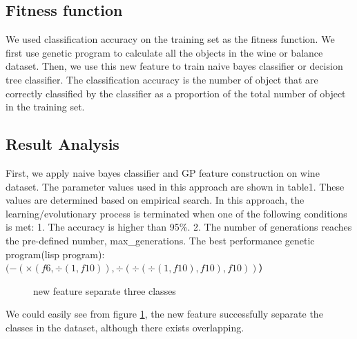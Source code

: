 \documentclass[11pt, a4paper, oneside, openright]{article}
\begin{document}
\subsection{Fitness function}
We used classification accuracy on the training set as the fitness function.  We first use genetic program to calculate all the objects in the wine or balance dataset. Then, we use this new feature to train naive bayes classifier or decision tree classifier.  The classification accuracy is the number of object that are correctly classified by the classifier as a proportion of the total number of object in the training set.

\subsection{Result Analysis}
First, we apply naive bayes classifier and GP feature construction on wine dataset.
The parameter values used in this approach are shown in table1. These values are determined based on empirical search. In this approach, the learning/evolutionary process is terminated when one of the following conditions is met:
1. The accuracy is higher than 95\%.
2. The number of generations reaches the pre-defined number, max\_generations.
The best performance genetic program(lisp program):
\newline \hspace * {4cm} $(- ( \times (f6,  \div (1, f10)),  \div ( \div ( \div (1, f10), f10), f10))）$
  \begin{figure}[!ht]
  \centerline{}
  \caption{new feature separate three classes}
  \label{fig:classes}
  \end{figure}
\newline We could easily see from figure \ref{fig:classes}, the new feature successfully separate the classes in the dataset, although there exists overlapping.
\end{document}
